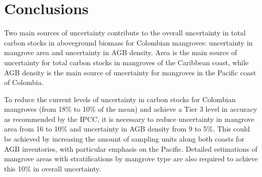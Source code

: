 \documentclass[review, authoryear]{elsarticle}   	%
\begin{document}
\section{Conclusions}
Two main sources of uncertainty contribute to the overall uncertainty in total carbon stocks in aboveground biomass for Colombian mangroves: uncertainty in mangrove area and uncertainty in AGB density. 
Area is the main source of uncertainty for total carbon stocks in mangroves of the Caribbean coast, while AGB density is the main source of uncertainty for mangroves in the Pacific coast of Colombia. %

To reduce the current levels of uncertainty in carbon stocks for Colombian mangroves (from 18\% to 10\% of the mean) and achieve a Tier 3 level in accuracy as recommended by the IPCC, it is necessary to reduce uncertainty in mangrove area from 16 to 10\% and uncertainty in AGB density from 9 to 5\%. This could be achieved by increasing the amount of sampling units along both coasts for AGB inventories, with particular emphasis on the Pacific. Detailed estimations of mangrove areas with stratifications by mangrove type are also required to achieve this 10\% in overall uncertainty. 

\end{document}
